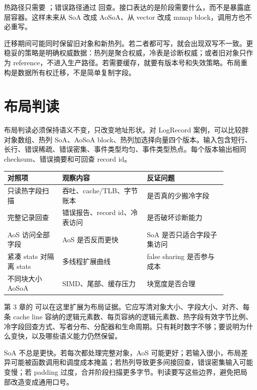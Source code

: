 热路径只需要 ；错误路径通过  回查。接口表达的是阶段需要什么，而不是暴露底层容器。这样未来从 SoA 改成 AoSoA、从 vector 改成 mmap block，调用方也不必重写。

迁移期间可能同时保留旧对象和新热列。若二者都可写，就会出现双写不一致。更稳妥的策略是明确权威数据：热列是聚合权威，冷表是诊断权威；或者旧对象只作为 reference，不进入生产路径。若需要缓存，就要有版本号和失效策略。布局重构是数据所有权迁移，不是简单复制字段。

\section{布局判读}

布局判读必须保持语义不变，只改变地址形状。对 LogRecord 案例，可以比较胖对象数组、热列 SoA、AoSoA block、热列加选择向量四个版本。输入包含短行、长行、错误稀疏、错误密集、事件类型均匀、事件类型热点。每个版本输出相同 checksum、错误摘要和可回查 record id。

\begin{center}
\begin{tabular}{p{0.22\linewidth}p{0.34\linewidth}p{0.32\linewidth}}
\toprule
对照项 & 观察内容 & 反证问题 \\
\midrule
只读热字段扫描 & 吞吐、cache/TLB、字节账本 & 是否真的少搬冷字段 \\
完整记录回查 & 错误报告、record id、冷表访问 & 是否破坏诊断能力 \\
AoS 访问全部字段 & AoS 是否反而更快 & SoA 是否只适合字段子集访问 \\
紧凑 stats 对隔离 stats & 多线程扩展曲线 & false sharing 是否参与成本 \\
不同块大小 AoSoA & SIMD、尾部、缓存压力 & 块宽度是否合理 \\
\bottomrule
\end{tabular}
\end{center}

第 3 章的  可以在这里扩展为布局证据。它应写清对象大小、字段大小、对齐、每条 cache line 容纳的逻辑元素数、每页容纳的逻辑元素数、热字段有效字节比例、冷字段回查方式、写者分布、分配器和生命周期。只有耗时数字不够；要说明为什么变快，以及哪些语义能力仍然保留。

SoA 不总是更快。若每次都处理完整对象，AoS 可能更好；若输入很小，布局差异可能被函数调用和调度成本掩盖；若热列导致更多间接回查，错误密集输入可能变慢；若 padding 过度，合并阶段扫描更多字节。判读要写这些边界，避免把局部改造变成通用口号。

